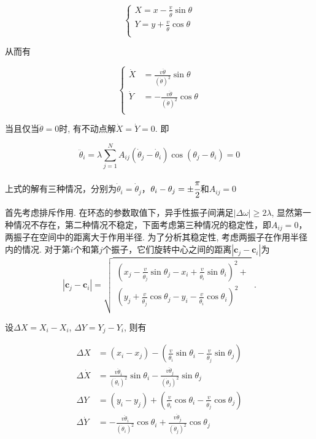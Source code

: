 \documentclass{article}
\begin{document}
$$
\begin{cases}
	X=x-\frac{v}{\dot{\theta}}\sin \theta\\
	Y=y+\frac{v}{\dot{\theta}}\cos \theta\\
\end{cases}
$$

从而有

$$
\left\{ \begin{aligned}
	\dot{X}&=\frac{v\ddot{\theta}}{\left( \dot{\theta} \right) ^2}\sin \theta\\
	\dot{Y}&=-\frac{v\ddot{\theta}}{\left( \dot{\theta} \right) ^2}\cos \theta\\
\end{aligned} \right. 
$$


当且仅当$\ddot{\theta}=0$时, 有不动点解$\dot{X}=\dot{Y}=0$. 即

$$
\ddot{\theta}_i=\lambda \sum_{j=1}^N{A_{ij}\left( \dot{\theta}_j-\dot{\theta}_i \right) \cos \left( \theta _j-\theta _i \right)}=0
$$

上式的解有三种情况，分别为$\dot{\theta}_i=\dot{\theta}_j$，$\theta _i-\theta _j=\pm\cfrac{\pi}{2}$和$A_{ij}=0$

首先考虑排斥作用. 在环态的参数取值下，异手性振子间满足$\left|\Delta\omega\right|\geqslant 2\lambda$, 显然第一种情况不存在，第二种情况不稳定，下面考虑第三种情况的稳定性，即$A_{ij}=0$，两振子在空间中的距离大于作用半径. 为了分析其稳定性, 考虑两振子在作用半径内的情况. 对于第$i$个和第$j$个振子，它们旋转中心之间的距离$\left| \mathbf{c}_j-\mathbf{c}_i \right|$为
\begin{equation}\label{eq:distanceCenter}
    \left| \mathbf{c}_j-\mathbf{c}_i \right|=\sqrt{\begin{array}{l}
        \left( x_j-\frac{v}{\dot{\theta}_j}\sin \theta _j-x_i+\frac{v}{\dot{\theta}_i}\sin \theta _i \right) ^2+\\
        \left( y_j+\frac{v}{\dot{\theta}_j}\cos \theta _j-y_i-\frac{v}{\dot{\theta}_i}\cos \theta _i \right) ^2\\
    \end{array}}\;.
\end{equation}

设$\Delta X=X_i-X_i$, $\Delta Y=Y_j-Y_i$, 则有

$$
\begin{aligned}
	\Delta X&=\left( x_i-x_j \right) -\left( \frac{v}{\dot{\theta}_i}\sin \theta _i-\frac{v}{\dot{\theta}_j}\sin \theta _j \right)\\
	\Delta \dot{X}&=\frac{v\ddot{\theta}_i}{\left( \dot{\theta}_i \right) ^2}\sin \theta _i-\frac{v\ddot{\theta}_j}{\left( \dot{\theta}_j \right) ^2}\sin \theta _j\\
	\Delta Y&=\left( y_i-y_j \right) +\left( \frac{v}{\dot{\theta}_i}\cos \theta _i-\frac{v}{\dot{\theta}_j}\cos \theta _j \right)\\
	\Delta \dot{Y}&=-\frac{v\ddot{\theta}_i}{\left( \dot{\theta}_i \right) ^2}\cos \theta _i+\frac{v\ddot{\theta}_j}{\left( \dot{\theta}_j \right) ^2}\cos \theta _j\\
\end{aligned}
$$
\end{document}
